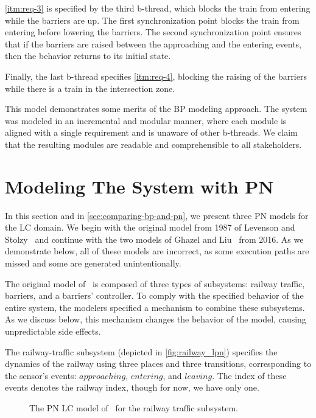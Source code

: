 \documentclass[10pt,journal,compsoc]{IEEEtran}
\theoremstyle{definition}
\begin{document}
\ref{itm:req-3} is specified by the third b-thread, which blocks the train from entering while the barriers are up. The first synchronization point blocks the train from entering before lowering the barriers. The second synchronization point ensures that if the barriers are raised between the approaching and the entering events, then the behavior returns to its initial state.

Finally, the last b-thread specifies \ref{itm:req-4}, blocking the raising of the barriers while there is a train in the intersection zone. 

This model demonstrates some merits of the BP modeling approach. The system was modeled in an incremental and modular manner, where each module is aligned with a single requirement and is unaware of other b-threads. We claim that the resulting modules are readable and comprehensible to all stakeholders.
    
\section{Modeling The System with PN}
\label{sec:modeling-pn}
In this section and in \autoref{sec:comparing-bp-and-pn}, we present three PN models for the LC domain. We begin with the original model from 1987 of Levenson and Stolzy~\cite{leveson1987safety} and continue with the two models of Ghazel and Liu~\cite{ghazel2016customizable} from 2016.
As we demonstrate below, all of these models are incorrect, as some execution paths are missed and some are generated unintentionally.

The original model of~\cite{leveson1987safety} is composed of three types of subsystems: railway traffic, barriers, and a barriers' controller. To comply with the specified behavior of the entire system, the modelers specified a mechanism to combine these subsystems. As we discuss below, this mechanism changes the behavior of the model, causing unpredictable side effects.

The railway-traffic subsystem (depicted in \autoref{fig:railway_lpn}) specifies the dynamics of the railway using three places and three transitions, corresponding to the sensor's events: $\mathit{approaching}$, $\mathit{entering}$, and $\mathit{leaving}$. The index of these events denotes the railway index, though for now, we have only one.

\begin{figure}
  \centering
{}
  \caption{The PN LC model of~\cite{leveson1987safety} for the railway traffic subsystem.}
  \label{fig:railway_lpn}
\end{figure}
\end{document}
